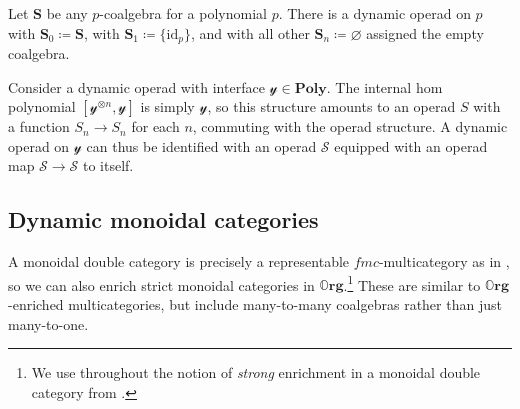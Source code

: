 \documentclass{eptcs}
\theoremstyle{definition}
\theoremstyle{plain}
\newenvironment{example}
  {\pushQED{\qed}\renewcommand{\qedsymbol}{$\lozenge$}\examplex}
  {\popQED\endexamplex}
\newcommand{\cat}[1]{\mathcal{#1}}%
\newcommand{\Cat}[1]{\textbf{#1}}%
\newcommand{\id}{\mathrm{id}}
\newcommand{\yon}{\mathcal{y}}
\newcommand{\poly}{\Cat{Poly}}
\newcommand{\0}{\textsf{0}}
\newcommand{\1}{\tn{\textsf{1}}}
\newcommand{\org}{{\mathbb{O}\Cat{rg}}}
\renewcommand{\S}{{\Cat{S}}}
\newcommand{\idcoalg}[1]{{\{\id_{#1}\}}}
\begin{document}
\begin{example}
Let $\S$ be any $p$-coalgebra for a polynomial $p$. There is a dynamic operad on $p$ with $\S_0\coloneqq \S$, with $\S_1\coloneqq\idcoalg{p}$, and with all other $\S_n\coloneqq\varnothing$ assigned the empty coalgebra.
\end{example}

\begin{example}
Consider a dynamic operad with interface $\yon\in\poly$. The internal hom polynomial $[\yon^{\otimes n},\yon]$ is simply $\yon$, so this structure amounts to an operad $S$ with a function $S_n \to S_n$ for each $n$, commuting with the operad structure. A dynamic operad on $\yon$ can thus be identified with an operad $\cat{S}$ equipped with an operad map $\cat{S}\to\cat{S}$ to itself.
\end{example}



\subsection{Dynamic monoidal categories}\label{sec:org_monoidalcats}


A monoidal double category is precisely a representable $f\!m\!c$-multicategory as in \cite[Section 2]{shapiro2022enrichment}, %
so we can also enrich strict monoidal categories in $\org$.\footnote{We use throughout the notion of \emph{strong} enrichment in a monoidal double category from \cite[Section 3]{shapiro2022enrichment}.} These are similar to $\org$-enriched multicategories, but include many-to-many coalgebras rather than just many-to-one. 
\end{document}
